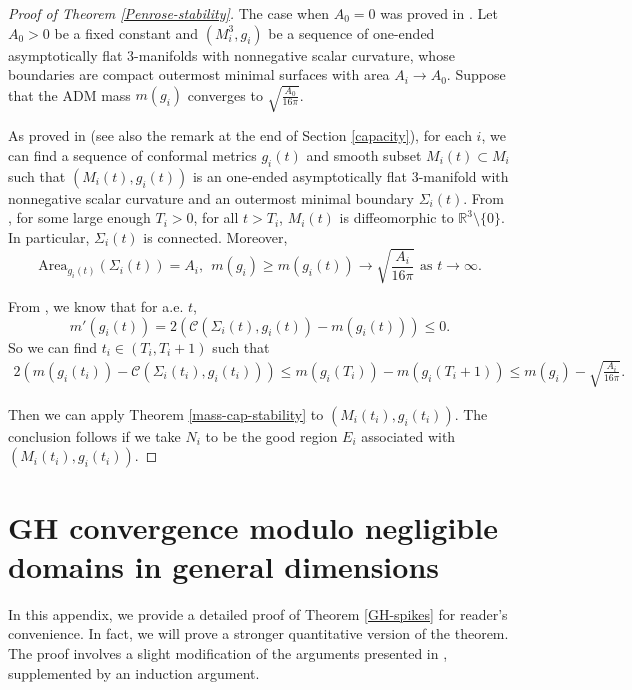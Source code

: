 \documentclass[letter]{amsart}
\theoremstyle{definition}
\theoremstyle{remark}
\begin{document}
\begin{proof}[Proof of Theorem \ref{Penrose-stability}]
	The case when $A_0=0$ was proved in \cite{DS'23}. Let $A_0 > 0$ be a fixed constant and $(M_i^{3}, g_i)$ be a sequence of one-ended asymptotically flat $3$-manifolds with nonnegative scalar curvature, whose boundaries are compact outermost minimal surfaces with area $A_i \to A_0$. Suppose that the ADM mass $m(g_i)$ converges to $ \sqrt{\frac{A_0}{16 \pi }} $.

	As proved in \cite{Bray'01} (see also the remark at the end of Section \ref{capacity}), for each $i$, we can find a sequence of conformal metrics $g_i(t)$  and smooth subset $M_i(t) \subset M_i$ such that $(M_i(t), g_i(t))$ is an one-ended asymptotically flat $3$-manifold with nonnegative scalar curvature and an outermost minimal boundary $\Sigma _i(t)$. From \cite[Theorem 4]{Bray'01}, for some large enough $T_i>0$, for all $t>T_i$, $M_i(t)$ is diffeomorphic to $\mathbb{R}^3 \setminus \{0\} $. In particular, $\Sigma _i(t)$ is connected. Moreover, 
	$$\mathrm{Area}_{g_i(t)}(\Sigma _i(t) ) = A_i,\ \  m(g_i ) \geq m(g_i(t)) \to  \sqrt{\frac{A_i}{16 \pi }} \text{ as } t\to \infty .$$


From \cite[Section 7]{Bray'01}, we know that for a.e. $t$, 
$$m'(g_i(t)) = 2\left(\mathcal{C}(\Sigma_i(t), g_{i}(t ) ) - m(g_i(t) ) \right) \leq 0.$$
So we can find $t_i \in (T_i, T_i+1)$ such that 
\begin{align*}
	2\left( m(g_i(t_i) ) - \mathcal{C}(\Sigma_i (t_i), g_i(t_i) ) \right) \leq m(g_i( T_i) ) - m(g_i (T_i+1) ) \leq m(g_i) - \sqrt{\frac{A_i}{16 \pi }} .
\end{align*}

Then we can apply Theorem \ref{mass-cap-stability} to $(M_i(t_i), g_i(t_i) )$. The conclusion follows if we take $N_i$ to be the good region $E_i$ associated with $(M_i(t_i), g_i(t_i) )$.

\end{proof}

\appendix

\section{GH convergence modulo negligible domains in general dimensions}\label{appendix}
In this appendix, we provide a detailed proof of Theorem \ref{GH-spikes} for reader's convenience. In fact, we will prove a stronger quantitative version of the theorem. The proof involves a slight modification of the arguments presented in \cite{DS'23}, supplemented by an induction argument.
\end{document}

